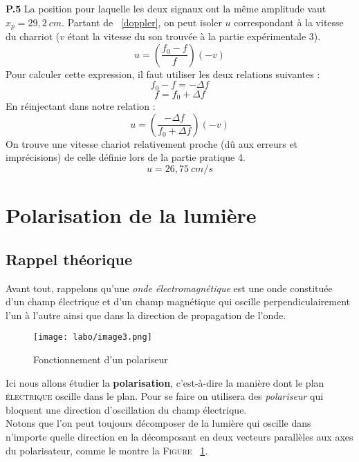\documentclass[british,french,11pt, a4paper, openany]{book}
\begin{document}
		\textbf{P.5}
		La position pour laquelle les deux signaux ont la même amplitude vaut $x_p = 29,2\ cm$. Partant de ~\eqref{doppler}, on peut isoler $u$ correspondant à la vitesse du charriot ($v$ étant la vitesse du son trouvée à la partie expérimentale 3).
		\begin{equation}
			u = \left(\frac{f_0 - f}{f}\right)\left(-v\right)
		\end{equation}
		Pour calculer cette expression, il faut utiliser les deux relations suivantes :
		\begin{equation}
			f_0 - f = -\Delta f
		\end{equation}
		\begin{equation}
			f = f_0 + \Delta f
		\end{equation}
		En réinjectant dans notre relation : 
		\begin{equation}
			u = \left(\frac{-\Delta f}{f_0 + \Delta f}\right)\left(-v\right)
		\end{equation}
		On trouve une vitesse chariot relativement proche (dû aux erreurs et imprécisions) de celle définie lors de la partie pratique 4.
		\begin{equation}
			u = 26,75\ cm/s
		\end{equation}
		
		
		\newpage
		\section{Polarisation de la lumière}
		\subsection{Rappel théorique}
		Avant tout, rappelons qu'une \textit{onde électromagnétique} est une onde constituée d'un champ électrique et d'un champ magnétique qui oscille perpendiculairement l'un à l'autre ainsi que dans la direction de propagation de l'onde.\\
		\begin{figure}[h]
			\begin{center}
				\texttt{[image: labo/image3.png]}
			\end{center}
			\caption{Fonctionnement d'un polariseur}
			\label{image1}
		\end{figure}
		Ici nous allons étudier la \textbf{polarisation}, c'est-à-dire la manière dont le plan \textsc{électrique} oscille dans le plan. Pour se faire on utilisera des \textit{polariseur} qui bloquent une direction d'oscillation du champ électrique.\\
		Notons que l'on peut toujours décomposer de la lumière qui oscille dans n'importe quelle direction en la décomposant en deux vecteurs parallèles aux axes du polarisateur, comme le montre la \textsc{Figure} ~\ref{image1}.\\
		
\end{document}
